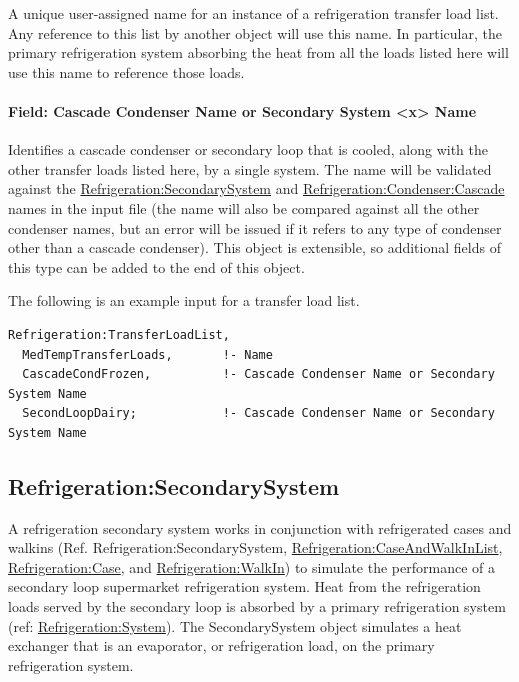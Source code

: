 A unique user-assigned name for an instance of a refrigeration transfer load list. Any reference to this list by another object will use this name. In particular, the primary refrigeration system absorbing the heat from all the loads listed here will use this name to reference those loads.

\paragraph{Field: Cascade Condenser Name or Secondary System \textless{}x\textgreater{} Name}\label{field-cascade-condenser-name-or-secondary-system-name}

Identifies a cascade condenser or secondary loop that is cooled, along with the other transfer loads listed here, by a single system. The name will be validated against the \hyperref[refrigerationsecondarysystem]{Refrigeration:SecondarySystem} and \hyperref[refrigerationcondensercascade]{Refrigeration:Condenser:Cascade} names in the input file (the name will also be compared against all the other condenser names, but an error will be issued if it refers to any type of condenser other than a cascade condenser).  This object is extensible, so additional fields of this type can be added to the end of this object.

The following is an example input for a transfer load list.

\begin{lstlisting}
Refrigeration:TransferLoadList,
  MedTempTransferLoads,       !- Name
  CascadeCondFrozen,          !- Cascade Condenser Name or Secondary System Name
  SecondLoopDairy;            !- Cascade Condenser Name or Secondary System Name
\end{lstlisting}

\subsection{Refrigeration:SecondarySystem}\label{refrigerationsecondarysystem}

A refrigeration secondary system works in conjunction with refrigerated cases and walkins (Ref. Refrigeration:SecondarySystem, \hyperref[refrigerationcaseandwalkinlist]{Refrigeration:CaseAndWalkInList}, \hyperref[refrigerationcase]{Refrigeration:Case}, and \hyperref[refrigerationwalkin]{Refrigeration:WalkIn}) to simulate the performance of a secondary loop supermarket refrigeration system. Heat from the refrigeration loads served by the secondary loop is absorbed by a primary refrigeration system (ref: \hyperref[refrigerationsystem]{Refrigeration:System}). The SecondarySystem object simulates a heat exchanger that is an evaporator, or refrigeration load, on the primary refrigeration system.

